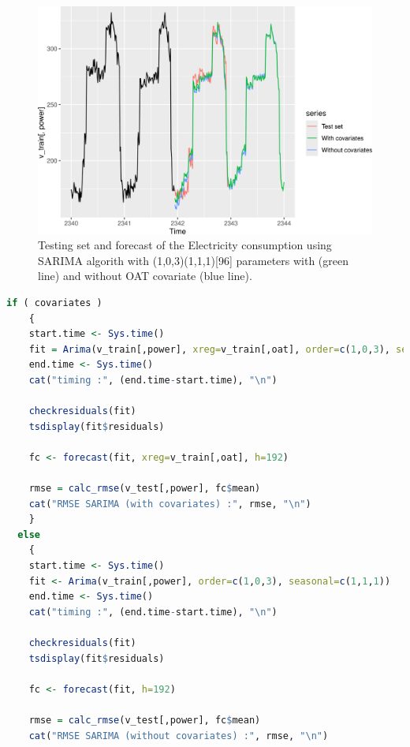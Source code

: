 \begin{figure}[H]
\centering
 \includegraphics[scale=0.5]{figures/figure_fit_sarima.png}
\caption{Testing set and forecast of the Electricity consumption using SARIMA algorith with 
(1,0,3)(1,1,1)[96] parameters with (green line) and without OAT covariate (blue line).}
\label{figure_fit_sarima}
\end{figure}

\newpage
\begin{lstlisting}[language=R, caption={R code for SARIMA modelling and forecasting}, captionpos=b, label={lst_sarima}]
  if ( covariates )
    {
    start.time <- Sys.time()
    fit = Arima(v_train[,power], xreg=v_train[,oat], order=c(1,0,3), seasonal=c(1,1,1))
    end.time <- Sys.time()
    cat("timing :", (end.time-start.time), "\n")

    checkresiduals(fit)
    tsdisplay(fit$residuals)

    fc <- forecast(fit, xreg=v_train[,oat], h=192)

    rmse = calc_rmse(v_test[,power], fc$mean)
    cat("RMSE SARIMA (with covariates) :", rmse, "\n")
    }
  else
    {
    start.time <- Sys.time()
    fit <- Arima(v_train[,power], order=c(1,0,3), seasonal=c(1,1,1))
    end.time <- Sys.time()
    cat("timing :", (end.time-start.time), "\n")

    checkresiduals(fit)
    tsdisplay(fit$residuals)

    fc <- forecast(fit, h=192)

    rmse = calc_rmse(v_test[,power], fc$mean)
    cat("RMSE SARIMA (without covariates) :", rmse, "\n")
\end{lstlisting}

